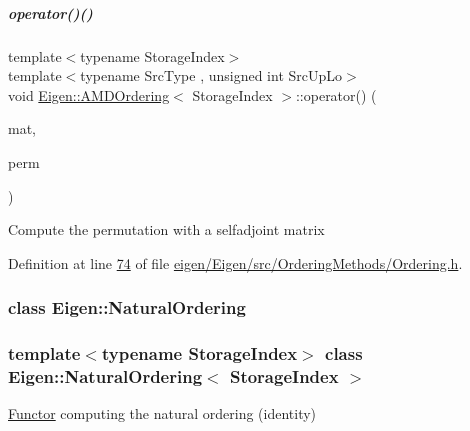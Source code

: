 \mbox{\label{group___ordering_methods___module_a7f3fd7224b084f0f5655c97ea8eb6466}} 
\subparagraph{\texorpdfstring{operator()()}{operator()()}\hspace{0.1cm}{\footnotesize\ttfamily [4/4]}}
{\footnotesize\ttfamily template$<$typename Storage\+Index$>$ \\
template$<$typename Src\+Type , unsigned int Src\+Up\+Lo$>$ \\
void \hyperlink{group___ordering_methods___module_class_eigen_1_1_a_m_d_ordering}{Eigen\+::\+A\+M\+D\+Ordering}$<$ Storage\+Index $>$\+::operator() (\begin{DoxyParamCaption}\item[{const \hyperlink{group___sparse_core___module_class_eigen_1_1_sparse_self_adjoint_view}{Sparse\+Self\+Adjoint\+View}$<$ Src\+Type, Src\+Up\+Lo $>$ \&}]{mat,  }\item[{\hyperlink{group___core___module}{Permutation\+Type} \&}]{perm }\end{DoxyParamCaption})\hspace{0.3cm}{\ttfamily [inline]}}

Compute the permutation with a selfadjoint matrix 

Definition at line \hyperlink{eigen_2_eigen_2src_2_ordering_methods_2_ordering_8h_source_l00074}{74} of file \hyperlink{eigen_2_eigen_2src_2_ordering_methods_2_ordering_8h_source}{eigen/\+Eigen/src/\+Ordering\+Methods/\+Ordering.\+h}.

\label{class_eigen_1_1_natural_ordering}
\subsubsection{class Eigen\+:\+:Natural\+Ordering}
\subsubsection*{template$<$typename Storage\+Index$>$\newline
class Eigen\+::\+Natural\+Ordering$<$ Storage\+Index $>$}

\hyperlink{struct_functor}{Functor} computing the natural ordering (identity)

